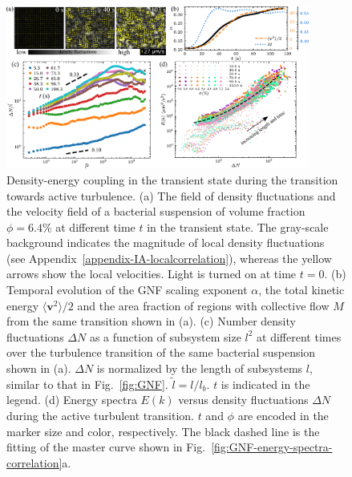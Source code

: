\documentclass[twocolumn,aps,prx,amsmath,amssymb,longbibliography,superscriptaddress]{revtex4-2}
\begin{document}
\begin{figure}[t]
\begin{center}
\includegraphics[width=0.89\textwidth]{Figures/fig-6.pdf}
\caption[The correlation between GNF and kinetic energy and kinetic energy spectra at transient state]
{
Density-energy coupling in the transient state during the transition towards active turbulence.
(a) The field of density fluctuations and the velocity field of a bacterial suspension of volume fraction $\phi=6.4\%$ at different time $t$ in the transient state. The gray-scale background indicates the magnitude of local density fluctuations (see Appendix~\ref{appendix-IA-localcorrelation}), whereas the yellow arrows show the local velocities. Light is turned on at time $t = 0$.
(b) Temporal evolution of the GNF scaling exponent $\alpha$, the total kinetic energy $\langle \bm{v}^2 \rangle/2$ and the area fraction of regions with collective flow $M$ from the same transition shown in (a).
(c) Number density fluctuations $\Delta N$ as a function of subsystem size $l^2$ at different times over the turbulence transition of the same bacterial suspension shown in (a). $\Delta N$ is normalized by the length of subsystems $l$, similar to that in Fig.~\ref{fig:GNF}. $\tilde{l} = l/l_b$. $t$ is indicated in the legend.
(d) Energy spectra $E(k)$ versus density fluctuations $\Delta N$ during the active turbulent transition. $t$ and $\phi$ are encoded in the marker size and color, respectively. The black dashed line is the fitting of the master curve shown in Fig.~\ref{fig:GNF-energy-spectra-correlation}a.
}
\label{fig:GNF-energy-spectra-correlation-transient}
\end{center}
\end{figure}
\end{document}
